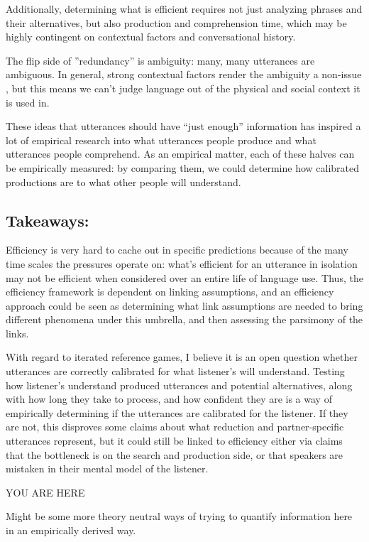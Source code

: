 \documentclass[]{article}
\begin{document}
Additionally, determining what is efficient requires not just analyzing phrases and their alternatives, but also production and comprehension time, which may be highly contingent on contextual factors and conversational history. 

The flip side of ''redundancy'' is ambiguity: many, many utterances are ambiguous. In general, strong contextual factors render the ambiguity a non-issue \cite{piantadosi2012}, but this means we can't judge language out of the physical and social context it is used in. 

These ideas that utterances should have ``just enough'' information has inspired a lot of empirical research into what utterances people produce and what utterances people comprehend. As an empirical matter, each of these halves can be empirically measured: by comparing them, we could determine how calibrated productions are to what other people will understand. 



\subsection{Takeaways:}
Efficiency is very hard to cache out in specific predictions because of the many time scales the pressures operate on: what's efficient for an utterance in isolation may not be efficient when considered over an entire life of language use. Thus, the efficiency framework is dependent on linking assumptions, and an efficiency approach could be seen as determining what link assumptions are needed to bring different phenomena under this umbrella, and then assessing the parsimony of the links.

With regard to iterated reference games, I believe it is an open question whether utterances are correctly calibrated for what listener's will understand. Testing how listener's understand produced utterances and potential alternatives, along with how long they take to process, and how confident they are is a way of empirically determining if the utterances are calibrated for the listener. If they are not, this disproves some claims about what reduction and partner-specific utterances represent, but it could still be linked to efficiency either via claims that the bottleneck is on the search and production side, or that speakers are mistaken in their mental model of the listener. 

YOU ARE HERE


Might be some more theory neutral ways of trying to quantify information here in an empirically derived way. 
\end{document}
